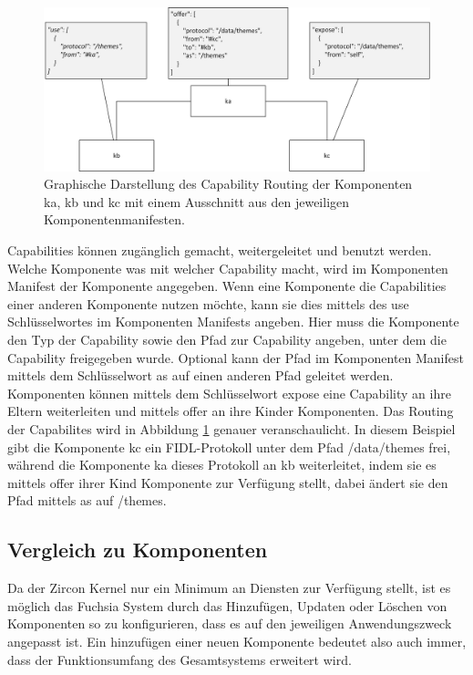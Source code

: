 \documentclass[a4paper]{scrartcl}
\begin{document}
\begin{figure}
	\centering
	\includegraphics[width=1\textwidth]{figure/Capability_Routing}
	\caption[Kurzform vom Bild]{Graphische Darstellung des Capability Routing der Komponenten ka, kb und kc mit einem Ausschnitt aus den jeweiligen Komponentenmanifesten.}
	\label{abb:capabilityRouting}
\end{figure}
Capabilities können zugänglich gemacht, weitergeleitet und benutzt werden. Welche Komponente was mit welcher Capability macht, wird im Komponenten Manifest der Komponente angegeben. Wenn eine Komponente die Capabilities einer anderen Komponente nutzen möchte, kann sie dies mittels des use Schlüsselwortes im Komponenten Manifests angeben. Hier muss die Komponente den Typ der Capability sowie den Pfad zur Capability angeben, unter dem die Capability freigegeben wurde. Optional kann der Pfad im Komponenten Manifest mittels dem Schlüsselwort as auf einen anderen Pfad geleitet werden. Komponenten können mittels dem Schlüsselwort expose eine Capability an ihre Eltern weiterleiten und mittels offer an ihre Kinder Komponenten. Das Routing der Capabilites wird in Abbildung \ref{abb:capabilityRouting} genauer veranschaulicht. In diesem Beispiel gibt die Komponente kc ein FIDL-Protokoll unter dem Pfad /data/themes frei, während die Komponente ka dieses Protokoll an kb weiterleitet, indem sie es mittels offer ihrer Kind Komponente zur Verfügung stellt, dabei ändert sie den Pfad mittels as auf /themes. 

\subsection{Vergleich zu Komponenten}
Da der Zircon Kernel nur ein Minimum an Diensten zur Verfügung stellt, ist es möglich das Fuchsia System durch das Hinzufügen, Updaten oder Löschen von Komponenten so zu konfigurieren, dass es auf den jeweiligen Anwendungszweck angepasst ist. Ein hinzufügen einer neuen Komponente bedeutet also auch immer, dass der Funktionsumfang des Gesamtsystems erweitert wird.
\end{document}
